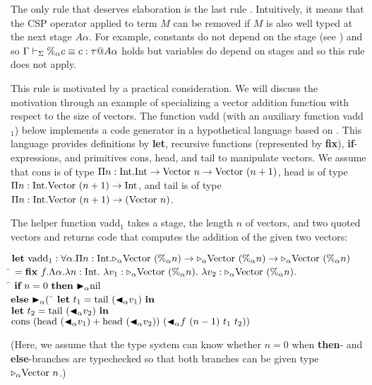 The only rule that deserves elaboration is the last rule \QPercent.
Intuitively, it means that the CSP operator applied to term $M$ can be
removed if $M$ is also well typed at the next stage \(A\alpha\).
For example, constants do not depend on the stage (see \TConst) and
so \(\Gamma\vdash_\Sigma \%_\alpha c \equiv c : \tau @ A\alpha\) holds but variables
do depend on stages and so this rule does not apply.

This rule is motivated by a practical consideration.  We will discuss
the motivation through an example of specializing a vector addition
function with respect to the size of vectors.  The function
vadd (with an auxiliary function vadd$_1$) below implements a code
generator in a hypothetical language based on \LTP.  This language
provides definitions by \textbf{let}, recursive functions (represented
by \textbf{fix}), \textbf{if}-expressions, and primitives cons, head,
and tail to manipulate vectors.
We assume that
$\text{cons}$ is of type $\Pi n:\textrm{Int}.\textrm{Int} \to \text{Vector}\ n \to \text{Vector}\ (n+1)$, 
$\text{head}$ is of type $\Pi n:\textrm{Int}.\text{Vector}\ (n+1) \to \textrm{Int}$, and
$\text{tail}$ is of type $\Pi n:\textrm{Int}.\text{Vector}\ (n+1) \to (\text{Vector}\ n)$.

The helper function vadd$_1$ takes a stage, the length $n$ of vectors, and two quoted vectors and returns code that computes the addition of the given two vectors:
%
\newcommand{\Vpn}{\text{Vector}\ (\%_\alpha n)}
\begin{tabbing}
	  $\textbf{let}\ \text{vadd}_1 : \F\alpha.\Pi n:\I.\TW_\alpha\Vpn\to\TW_\alpha\Vpn\to\TW_\alpha\Vpn$                                \\
	  \hspace{6mm} \= $= \textbf{fix}\ f.\Lambda\alpha.\lambda n:\I.\ \lambda v_1:\TW_\alpha\Vpn.\ \lambda v_2:\TW_\alpha\Vpn.$            \\
	  \> \hspace{6mm} \= $\textbf{if}\ n = 0 \ \textbf{then}\ {\mathop{\blacktriangleright}}_\alpha \text{nil}$ \\
	  \>\> $\textbf{else}\ {\mathop{\blacktriangleright}}_\alpha ($ \= $\textbf{let}\ t_1 = \text{tail}\ ({\mathop{\blacktriangleleft}}_\alpha v_1)\ \textbf{in}$ \\
	  \>\>\> $\textbf{let}\ t_2 = \text{tail}\ ({\mathop{\blacktriangleleft}}_\alpha v_2)\ \textbf{in}$ \\
          \>\>\> $\text{cons}\ (\text{head}\ ({\mathop{\blacktriangleleft}}_\alpha v_1) + \text{head}\ ({\mathop{\blacktriangleleft}}_\alpha v_2))\ ({\mathop{\blacktriangleleft}}_\alpha f\ (n-1)\ t_1\ t_2))$
\end{tabbing}
(Here, we assume that the type system can know whether $n=0$ when
\textbf{then}- and \textbf{else}-branches are typechecked so that
both branches can be given type \({\mathop{\triangleright}}_\alpha \text{Vector }n\).)

